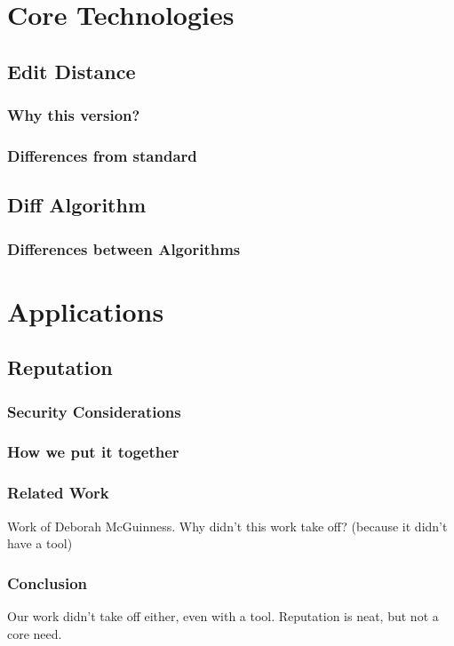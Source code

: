 
\part{Core Technologies}

\chapter{Edit Distance}
    \section{Why this version?}
    \section{Differences from standard}

\chapter{Diff Algorithm}
    \section{Differences between Algorithms}

\part{Applications}

\chapter{Reputation}
    \section{Security Considerations}
    \section{How we put it together}

    \section{Related Work}
        Work of Deborah McGuinness.  Why didn't this work take off?
        (because it didn't have a tool)
    \section{Conclusion}
        Our work didn't take off either, even with a tool.
        Reputation is neat, but not a core need.

